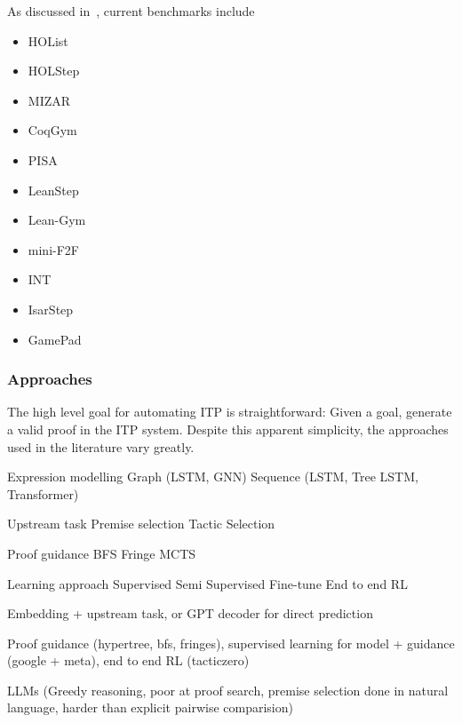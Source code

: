 \documentclass{article}
\begin{document}
    As discussed in~\cite{lu_survey_nodate}, current benchmarks include
    \begin{itemize}
        \item HOList~\cite{bansal_holist_2019}
        \item HOLStep~\cite{kaliszyk_holstep_2017}
        \item MIZAR~\cite{jakubuv_mizar_2023, grabowski_four_2015}
        \item CoqGym~\cite{yang_learning_2019}
        \item PISA~\cite{lu_survey_nodate}
        \item LeanStep~\cite{han_proof_2021}
        \item Lean-Gym~\cite{polu_formal_2022}
        \item mini-F2F~\cite{zheng_minif2f_2021}
        \item INT~\cite{wu_int_2020}
        \item IsarStep~\cite{li_isarstep_2020}
        \item GamePad~\cite{huang_gamepad_2018}
    \end{itemize}


    \subsubsection{Approaches}

    The high level goal for automating ITP is straightforward: Given a goal, generate a valid proof in the ITP system.
    Despite this apparent simplicity, the approaches used in the literature vary greatly.

    Expression modelling
        Graph (LSTM, GNN)
        Sequence (LSTM, Tree LSTM, Transformer)

    Upstream task
        Premise selection
        Tactic Selection

    Proof guidance
        BFS
        Fringe
        MCTS

    Learning approach
        Supervised
        Semi Supervised
        Fine-tune
        End to end RL

    Embedding + upstream task, or GPT decoder for direct prediction


    Proof guidance (hypertree, bfs, fringes),
    supervised learning for model + guidance (google + meta),
    end to end RL (tacticzero)

    LLMs (Greedy reasoning, poor at proof search, premise selection done in natural language, harder than explicit pairwise comparision)
\end{document}
